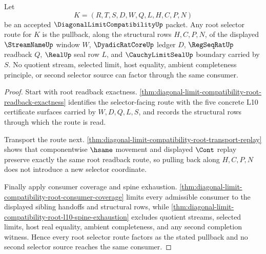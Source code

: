\begin{theorem}
\label{thm:diagonal-limit-compatibility-root-selector-pullback}
Let
$$
K=(R,T,S,D,W,Q,L,H,C,P,N)
$$
be an accepted $\DiagonalLimitCompatibilityUp$ packet. Any root selector route for $K$ is the pullback, along the structural rows $H,C,P,N$, of the displayed $\StreamNameUp$ window $W$, $\DyadicRatCoreUp$ ledger $D$, $\RegSeqRatUp$ readback $Q$, $\RealUp$ seal row $L$, and $\CauchyLimitSealUp$ boundary carried by $S$. No quotient stream, selected limit, host equality, ambient completeness principle, or second selector source can factor through the same consumer.
\end{theorem}
\begin{proof}
Start with root readback exactness. \autoref{thm:diagonal-limit-compatibility-root-readback-exactness} identifies the selector-facing route with the five concrete L10 certificate surfaces carried by $W,D,Q,L,S$, and records the structural rows through which the route is read.

Transport the route next. \autoref{thm:diagonal-limit-compatibility-root-transport-replay} shows that componentwise $\hsame$ movement and displayed $\Cont$ replay preserve exactly the same root readback route, so pulling back along $H,C,P,N$ does not introduce a new selector coordinate.

Finally apply consumer coverage and spine exhaustion. \autoref{thm:diagonal-limit-compatibility-root-consumer-coverage} limits every admissible consumer to the displayed sibling handoffs and structural rows, while \autoref{thm:diagonal-limit-compatibility-root-l10-spine-exhaustion} excludes quotient streams, selected limits, host real equality, ambient completeness, and any second completion witness. Hence every root selector route factors as the stated pullback and no second selector source reaches the same consumer.
\end{proof}

